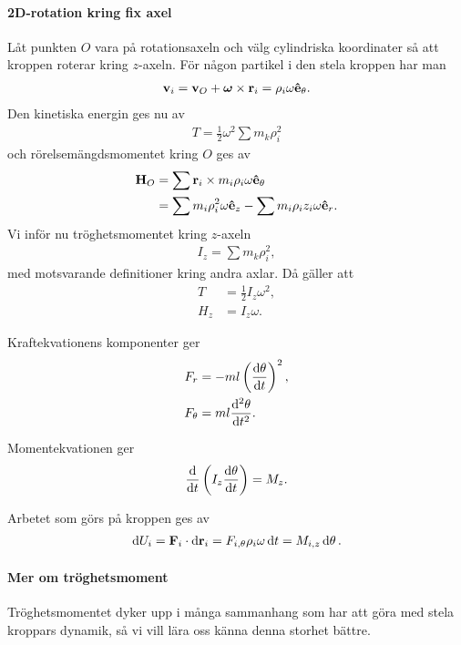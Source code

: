 \paragraph{2D-rotation kring fix axel}
Låt punkten $O$ vara på rotationsaxeln och välg cylindriska koordinater så att kroppen roterar kring $z$-axeln. För någon partikel i den stela kroppen har man
\begin{align*}
	\vb{v}_{i} = \vb{v}_{O} + \vb*{\omega}\times\vb{r}_{i} = \rho_{i}\omega\vu{e}_{\theta}.
\end{align*}
Den kinetiska energin ges nu av
\begin{align*}
	T = \frac{1}{2}\omega^2\sum m_{k}\rho_{i}^2
\end{align*}
och rörelsemängdsmomentet kring $O$ ges av
\begin{align*}
	\vb{H}_{O} &= \sum \vb{r}_{i}\times m_{i}\rho_{i}\omega\vu{e}_{\theta} \\
	           &= \sum m_{i}\rho_{i}^2\omega\vu{e}_{z} - \sum m_{i}\rho_{i}z_{i}\omega\vu{e}_{r}.
\end{align*}
Vi inför nu tröghetsmomentet kring $z$-axeln
\begin{align*}
	I_{z} = \sum m_{k}\rho_{i}^2,
\end{align*}
med motsvarande definitioner kring andra axlar. Då gäller att
\begin{align*}
	T     &= \frac{1}{2}I_{z}\omega^2, \\
	H_{z} &= I_{z}\omega.
\end{align*}

Kraftekvationens komponenter ger
\begin{align*}
	F_{r}      &= -ml\left(\dv{\theta}{t}\right)^2, \\
	F_{\theta} &= ml\dv[2]{\theta}{t}.
\end{align*}

Momentekvationen ger
\begin{align*}
	\dv{t}\left(I_{z}\dv{\theta}{t}\right) = M_{z}.
\end{align*}

Arbetet som görs på kroppen ges av
\begin{align*}
	\dd{U_{i}} = \vb{F}_{i}\cdot\dd{\vb{r}_{i}} = F_{i, \theta}\rho_{i}\omega\dd{t} = M_{i, z}\dd{\theta}.
\end{align*}

\paragraph{Mer om tröghetsmoment}
Tröghetsmomentet dyker upp i många sammanhang som har att göra med stela kroppars dynamik, så vi vill lära oss känna denna storhet bättre.

